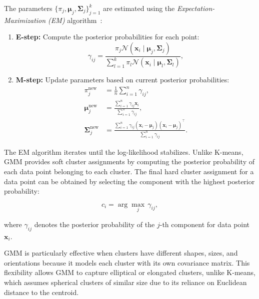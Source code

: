 The parameters $\{\pi_j, \boldsymbol{\mu}_j, \mathbf{\Sigma}_j\}_{j=1}^k$ are
estimated using the \emph{Expectation-Maximization (EM)}
algorithm~\cite{em_algorithm}:

\begin{enumerate}
    \item \textbf{E-step:} Compute the posterior probabilities for each point:
          \begin{equation}
              \gamma_{ij} = \frac{\pi_j \mathcal{N}(\mathbf{x}_i \mid \boldsymbol{\mu}_j, \mathbf{\Sigma}_j)}
              {\sum_{l=1}^{k} \pi_l \mathcal{N}(\mathbf{x}_i \mid \boldsymbol{\mu}_l, \mathbf{\Sigma}_l)},
          \end{equation}

    \item \textbf{M-step:} Update parameters based on current posterior probabilities:
          \begin{align}
              \pi_j^{\text{new}}              & = \frac{1}{n} \sum_{i=1}^{n} \gamma_{ij},                                                                      \\
              \boldsymbol{\mu}_j^{\text{new}} & = \frac{\sum_{i=1}^{n} \gamma_{ij} \mathbf{x}_i}{\sum_{i=1}^{n} \gamma_{ij}},                                  \\
              \mathbf{\Sigma}_j^{\text{new}}  & = \frac{\sum_{i=1}^{n} \gamma_{ij}(\mathbf{x}_i - \boldsymbol{\mu}_j)(\mathbf{x}_i - \boldsymbol{\mu}_j)^\top}
              {\sum_{i=1}^{n} \gamma_{ij}}.
          \end{align}
\end{enumerate}

The EM algorithm iterates until the log-likelihood stabilizes. Unlike K-means,
GMM provides soft cluster assignments by computing the posterior probability of
each data point belonging to each cluster. The final hard cluster assignment
for a data point can be obtained by selecting the component with the highest
posterior probability:

\begin{equation}
    c_i = \arg\max_{j} \, \gamma_{ij},
\end{equation}

where $\gamma_{ij}$ denotes the posterior probability of the $j$-th component
for data point $\mathbf{x}_i$.

GMM is particularly effective when clusters have different shapes, sizes, and
orientations because it models each cluster with its own covariance matrix.
This flexibility allows GMM to capture elliptical or elongated clusters, unlike
K-means, which assumes spherical clusters of similar size due to its reliance
on Euclidean distance to the centroid.

